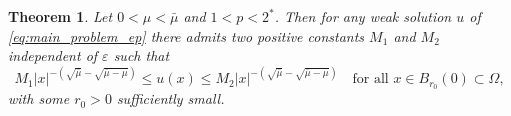 \documentclass[11pt]{article}
\newtheorem{theorem}{Theorem}[section] %
\newcommand{\la} {\lambda}
\newcommand{\La} {\Lambda}
\begin{document}
\begin{theorem}\label{thm:asympototic_estimates}
Let $0 < \mu < \bar\mu$ and $1<p<2^*$. Then for any weak solution $u$ of \eqref{eq:main_problem_ep} there admits two positive constants $M_1$ and $M_2$ independent of $\varepsilon$ such that
\begin{equation*}
M_1 |x|^{- \left( \sqrt{\bar{\mu}} - \sqrt{\bar{\mu} - \mu} \right)} \leq u(x) \leq M_2 |x|^{- \left( \sqrt{\bar{\mu}} - \sqrt{\bar{\mu} - \mu} \right)} \quad \text{for all } x \in B_{r_0}(0) \subset \Omega,
\end{equation*}
with some $r_0 > 0$ sufficiently small.
\end{theorem}




\end{document}
